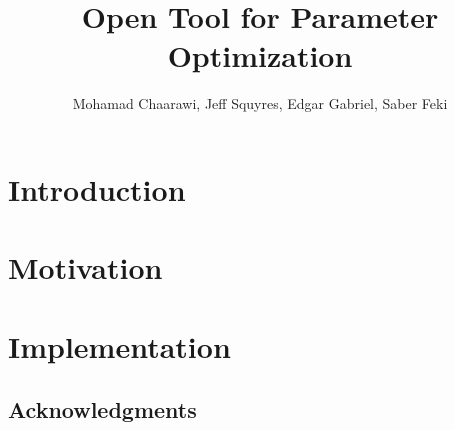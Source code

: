 \documentclass{llncs}
\begin{document}
\title{Open Tool for Parameter Optimization}

\author{
Mohamad Chaarawi,
Jeff Squyres,
Edgar Gabriel,
Saber Feki
}


\maketitle
\begin{abstract}

\end{abstract}

\section{Introduction}
\label{sec:intro}


\section{Motivation}
\label{sec:mot}


\section{Implementation}
\label{sec:impl}


%

%

\subsection*{Acknowledgments}




\noindent
\end{document}
